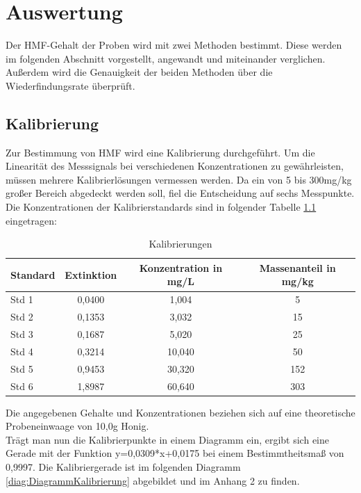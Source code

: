 \chapter{Auswertung}
Der HMF-Gehalt der Proben wird mit zwei Methoden bestimmt. Diese werden im folgenden Abschnitt vorgestellt, angewandt und miteinander verglichen. Außerdem wird die Genauigkeit der beiden Methoden über die Wiederfindungsrate überprüft.
\section{Kalibrierung}
Zur Bestimmung von HMF wird eine Kalibrierung durchgeführt. Um die Linearität des Messsignals bei verschiedenen Konzentrationen zu gewährleisten, müssen mehrere Kalibrierlösungen vermessen werden. Da ein von 5 bis 300mg/kg großer Bereich abgedeckt werden soll, fiel die Entscheidung auf sechs Messpunkte. Die Konzentrationen der Kalibrierstandards sind in folgender Tabelle \ref{tab:Kalibrierungen} eingetragen:

\begin{table}[htbp]
    \centering
    \caption{Kalibrierungen}
        \begin{tabular}{l|c|c|c}
            Standard & Extinktion & Konzentration in mg/L &  Massenanteil in mg/kg\\
            \hline
            Std 1 & 0,0400 & 1,004 & 5\\
            \hline
            Std 2 & 0,1353 & 3,032 & 15\\
            \hline
            Std 3 & 0,1687 & 5,020 & 25\\
            \hline
            Std 4 & 0,3214 & 10,040 & 50\\
            \hline
            Std 5 & 0,9453 & 30,320 & 152\\
            \hline
            Std 6 & 1,8987 & 60,640 & 303
        \end{tabular}
        \label{tab:Kalibrierungen}
\end{table}

Die angegebenen Gehalte und Konzentrationen beziehen sich auf eine theoretische Probeneinwaage von 10,0g Honig.\\
Trägt man nun die Kalibrierpunkte in einem Diagramm ein, ergibt sich eine Gerade mit der Funktion y=0,0309*x+0,0175 bei einem Bestimmtheitsmaß von 0,9997. Die Kalibriergerade ist im folgenden Diagramm \ref{diag:DiagrammKalibrierung} abgebildet und im Anhang 2 zu finden.

